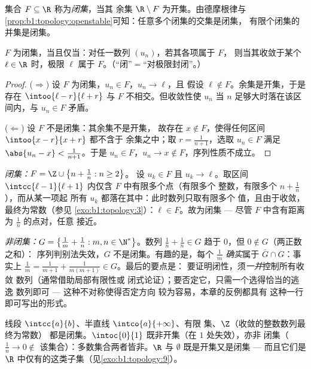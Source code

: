 \begin{definition}[闭集]\label{def:b1:topology:closed}
集合 $F \subseteq \R$ 称为\emph{闭集}，当其
余集 $\R \setminus F$ 为开集。由德摩根律与
\cref{prop:b1:topology:openstable}可知：任意多个闭集的交集是闭集，
有限个闭集的并集是闭集。
\end{definition}

\begin{theorem}[闭集的序列刻画]\label{thm:b1:topology:seqclosed}
$F$ 为闭集，当且仅当：对任一数列 $(u_n)$，若其各项属于 $F$，
则当其收敛于某个 $\ell \in \R$ 时，极限 $\ell$ 属于
$F$。（“闭”$=$“对极限封闭”。）
\end{theorem}

\begin{proof}
($\Rightarrow$) 设 $F$ 为闭集，$u_n \in F$，$u_n \to \ell$，且
假设 $\ell \notin F$。余集是开集，于是存在
$\intoo{\ell - r}{\ell + r}$ 与 $F$ 不相交。但收敛性使 $u_n$
当 $n$ 足够大时落在该区间内，与 $u_n \in F$ 矛盾。

($\Leftarrow$) 设 $F$ 不是闭集：其余集不是开集，
故存在 $x \notin F$，使得任何区间 $\intoo{x - r}{x + r}$ 都不含于
余集之中；取 $r = \frac{1}{n+1}$，选取 $u_n \in F$ 满足
$\abs{u_n - x} < \frac{1}{n+1}$。于是 $u_n \in F$，$u_n \to x \notin
F$，序列性质不成立。
\end{proof}

\begin{example}[序列判别法的两个方向]\label{ex:b1:topology:seqtest}
\emph{闭集：}$F = \Z \cup \bigl\{n + \frac1n : n \geq 2\bigr\}$。
设 $u_k \in F$ 且 $u_k \to \ell$。取区间 $\intcc{\ell -
1}{\ell + 1}$ 内仅含 $F$ 中有限多个点（有限多个
整数，有限多个 $n + \frac1n$），而从某一项起
所有 $u_k$ 都落在其中：此时数列只取有限多个
值，且由于收敛，最终为常数（参见
\cref{exo:b1:topology:3}）：$\ell \in F$。故为闭集 --- 尽管
$F$ 中含有距离为 $\frac1n$ 的点对，任意
接近。

\emph{非闭集：}$G = \bigl\{\frac1m + \frac1n : m, n \in
\N^*\bigr\}$。数列 $\frac1n + \frac1n \in G$ 趋于
$0$，但 $0 \notin G$（两正数之和）：
序列判别法失效，$G$ 不是闭集。有趣的是，每个
$\frac1m$ \emph{确实}属于 $\overline G \cap G$：事实上
$\frac1m = \frac{1}{m+1} + \frac{1}{m(m+1)} \in G$。最后的要点是：
要证明闭性，须\emph{一并}控制所有收敛
数列（通常借助局部有限性或
闭式论证）；要否定它，只需一个选得恰当的逃逸
数列即可 --- 这种不对称使得否定方向
较为容易，本章的反例都具有
这种一行即可写出的形式。
\end{example}

\begin{example}\label{ex:b1:topology:closed}
线段 $\intcc{a}{b}$、半直线 $\intco{a}{+\infty}$、有限
集、$\Z$（收敛的整数数列最终为常数）
都是闭集。$\intoc{0}{1}$ 既非开集（在 $1$ 处失效），亦非
闭集（$\frac 1n \to 0 \notin$ 该集合）：多数集合两者皆非。$\R$ 与
$\emptyset$ 既是开集又是闭集 --- 而且它们是
$\R$ 中仅有的这类子集（见\cref{exo:b1:topology:9}）。
\end{example}

